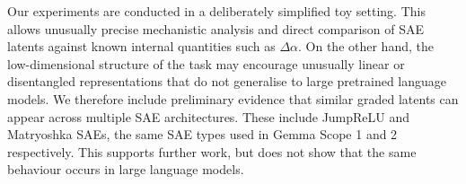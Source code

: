 Our experiments are conducted in a deliberately simplified toy setting. This allows unusually precise mechanistic analysis and direct comparison of SAE latents against known internal quantities such as $\Delta \alpha$. On the other hand, the low-dimensional structure of the task may encourage unusually linear or disentangled representations that do not generalise to large pretrained language models.
We therefore include preliminary evidence that similar graded latents can appear across multiple SAE architectures. These include JumpReLU and Matryoshka SAEs, the same SAE types used in Gemma Scope 1 \cite{lieberum2024gemma} and 2 \cite{mcdougall2025gemmascope2} respectively. This supports further work, but does not show that the same behaviour occurs in large language models.
